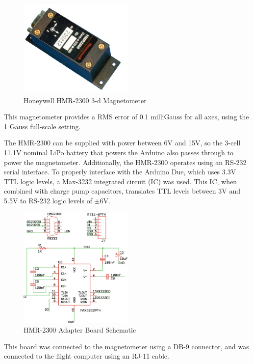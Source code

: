 \begin{figure}[H]
  \caption{Honeywell HMR-2300 3-d Magnetometer } \label{hmr23000Picture}
  \centering
    \includegraphics[width=0.5\textwidth]{figures/hmr2300.jpg}
\end{figure}

This magnetometer provides a RMS error of 0.1 milliGauss for all axes, using the 1 Gauss full-scale setting\cite{hmr2300DataSheet}. 

The HMR-2300 can be supplied with power between 6V and 15V, so the 3-cell 11.1V nominal LiPo battery that powers the Arduino also passes through to power the magnetometer. Additionally, the HMR-2300 operates using an RS-232 serial interface. To properly interface with the Arduino Due, which uses 3.3V TTL logic levels, a Max-3232 integrated circuit (IC) was used. This IC, when combined with charge pump capacitors, translates TTL levels between 3V and 5.5V to RS-232 logic levels of $\pm6$V.
 \begin{figure}[H]
   \caption{HMR-2300 Adapter Board Schematic} \label{magBoardSchematic}
   \centering
     \includegraphics[width=0.5\textwidth]{figures/magBoard.eps}
 \end{figure}
 This board was connected to the magnetometer using a DB-9 connector, and was connected to the flight computer using an RJ-11 cable.\\
 
